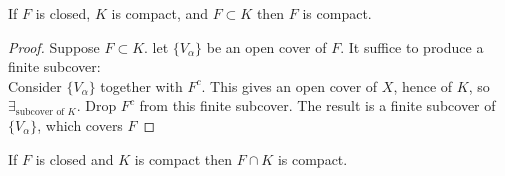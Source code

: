 \begin{thm}[35]
	If $F$ is closed, $K$ is compact, and $F \subset K$ then $F$ is compact.
	\begin{proof}
		Suppose $F \subset K$. let $\{V_{\alpha}\}$ be an open cover of $F$. It suffice to produce a finite subcover:\\
		Consider $\{V_{\alpha}\}$ together with $F^{c}$. This gives an open cover of $X$, hence of $K$, so $\exists_{\text{subcover of $K$}}$.
		Drop $F^{c}$ from this finite subcover. The result is a finite subcover of $\{V_{\alpha}\}$, which covers $F$
	\end{proof}
	\begin{corollary}
		If $F$ is closed and $K$ is compact then $F \cap K$ is compact.
	\end{corollary}
\end{thm}

